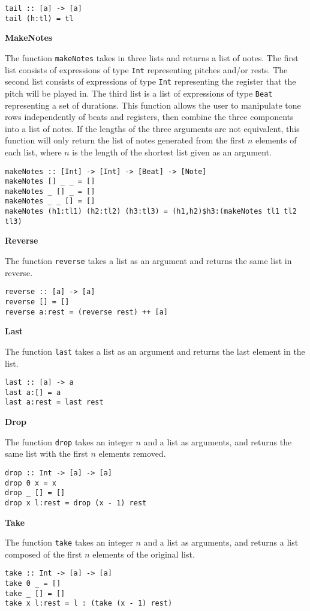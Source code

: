 \begin{verbatim}
tail :: [a] -> [a]
tail (h:tl) = tl
\end{verbatim} 


\noindent\textbf{MakeNotes}

The function \texttt{makeNotes} takes in three lists and returns a list 
of notes. The first list consists of expressions of type \texttt{Int} representing 
pitches and/or rests. The second list consists of expressions of type \texttt{Int}
representing the register that the pitch will be played in. The third list is a list 
of expressions of type \texttt{Beat} representing a set of durations.  This function allows the user 
to manipulate tone rows independently of beats and registers, then combine the three components
into a list of notes. If the lengths of the three arguments are not equivalent, this function
will only return the list of notes generated from the first $n$ elements of each list, where $n$ is the
length of the shortest list given as an argument.

\begin{verbatim}
makeNotes :: [Int] -> [Int] -> [Beat] -> [Note]
makeNotes [] _ _ = []
makeNotes _ [] _ = []
makeNotes _ _ [] = []
makeNotes (h1:tl1) (h2:tl2) (h3:tl3) = (h1,h2)$h3:(makeNotes tl1 tl2 tl3)
\end{verbatim}


\noindent \textbf{Reverse}

The function \texttt{reverse} takes a list as an argument and returns the same list in reverse.

\begin{verbatim}
reverse :: [a] -> [a]
reverse [] = []
reverse a:rest = (reverse rest) ++ [a]
\end{verbatim}


\noindent \textbf{Last}

The function \texttt{last} takes a list as an argument and returns the last element in the list.

\begin{verbatim}
last :: [a] -> a
last a:[] = a
last a:rest = last rest
\end{verbatim}

\noindent \textbf{Drop}

The function \texttt{drop} takes an integer $n$ and a list as arguments, and returns the same list
with the first $n$ elements removed.

\begin{verbatim}
drop :: Int -> [a] -> [a]
drop 0 x = x
drop _ [] = []
drop x l:rest = drop (x - 1) rest
\end{verbatim}

\noindent \textbf{Take}

The function \texttt{take} takes an integer $n$ and a list as arguments, and returns a list composed
of the first $n$ elements of the original list.

\begin{verbatim}
take :: Int -> [a] -> [a]
take 0 _ = []
take _ [] = []
take x l:rest = l : (take (x - 1) rest)
\end{verbatim}
